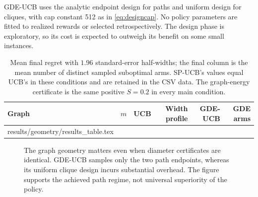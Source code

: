 GDE-UCB uses the analytic endpoint design for paths and uniform design for cliques, with cap constant 512 as in \eqref{eq:designcap}. No policy parameters are fitted to realized rewards or selected retrospectively. The design phase is exploratory, so its cost is expected to outweigh its benefit on some small instances.

\begin{table}[t]
\centering\small
\begin{tabular}{lrrrrr}
\toprule
Graph & $m$ & UCB & Width profile & GDE-UCB & GDE arms\\
\midrule
{} results/geometry/results_table.tex
\bottomrule
\end{tabular}
\caption{Mean final regret with $1.96$ standard-error half-widths; the final column is the mean number of distinct sampled suboptimal arms. SP-UCB's values equal UCB's in these conditions and are retained in the CSV data. The graph-energy certificate is the same positive $S=0.2$ in every main condition.}
\label{tab:geometryresults}
\end{table}

\begin{figure}[t]
\centering
{}
\caption{The graph geometry matters even when diameter certificates are identical. GDE-UCB samples only the two path endpoints, whereas its uniform clique design incurs substantial overhead. The figure supports the achieved path regime, not universal superiority of the policy.}
\label{fig:geometryscaling}
\end{figure}



